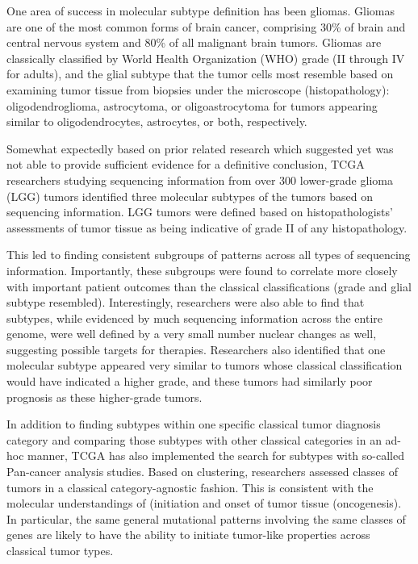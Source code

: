         One area of success in molecular subtype definition has been
        gliomas. Gliomas are one of the most common forms of brain
        cancer, comprising 30\% of brain and central nervous system
        and 80\% of all malignant brain tumors. Gliomas are
        classically classified by World Health Organization (WHO)
        grade (II through IV for adults), and the glial subtype that
        the tumor cells most resemble based on examining tumor tissue
        from biopsies under the microscope (histopathology):
        oligodendroglioma, astrocytoma, or oligoastrocytoma for tumors
        appearing similar to oligodendrocytes, astrocytes, or both,
        respectively. 
        

        Somewhat expectedly based on prior related research which suggested
        yet was not able to provide sufficient evidence for a definitive
        conclusion, TCGA researchers studying sequencing information from over
        300 lower-grade glioma (LGG) tumors identified three molecular
        subtypes of the tumors based on sequencing information. LGG tumors
        were defined based on histopathologists’ assessments of tumor tissue
        as being indicative of grade II of any histopathology.


        This led to finding consistent subgroups of patterns across
        all types of  sequencing information. Importantly, these
        subgroups were found to correlate more closely with important
        patient outcomes than the classical classifications (grade and
        glial subtype resembled). Interestingly, researchers were also
        able to find that subtypes, while evidenced by much sequencing
        information across the entire genome, were well defined by a
        very small number nuclear changes as well, suggesting possible
        targets for therapies. Researchers also identified that one
        molecular subtype appeared very similar to tumors whose
        classical classification would have indicated a higher grade,
        and these tumors had similarly poor prognosis as these
        higher-grade tumors.


        

        In addition to finding subtypes within one specific classical tumor
        diagnosis category and comparing those subtypes with other classical
        categories in an ad-hoc manner, TCGA has also implemented the search
        for subtypes with so-called Pan-cancer analysis\cite{weinstein_cancer_2013} studies. Based on
        clustering, researchers assessed classes of tumors in a classical
        category-agnostic fashion. This is consistent with the molecular
        understandings of (initiation and onset of tumor tissue
        (oncogenesis). In particular, the same general mutational patterns
        involving the same classes of genes are likely to have the ability to
        initiate tumor-like properties across classical tumor
        types.

